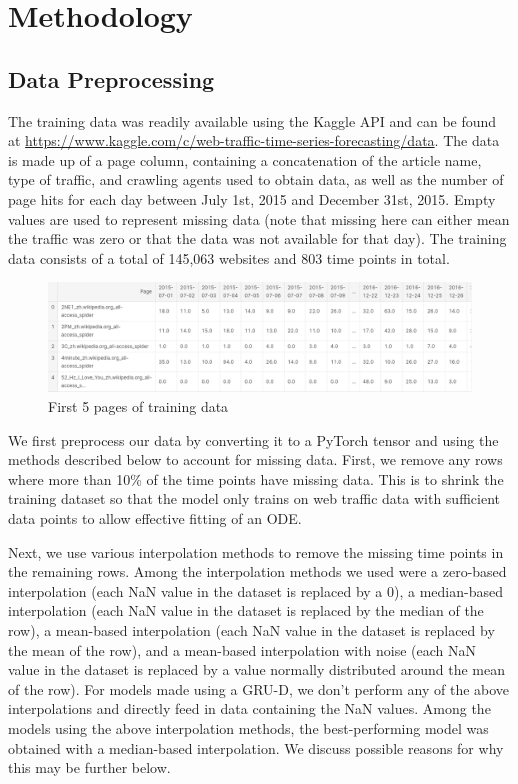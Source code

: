 \documentclass{article} %
\begin{document}
\section{Methodology}
\subsection{Data Preprocessing}

The training data was readily available using the Kaggle API and can be found at \url{https://www.kaggle.com/c/web-traffic-time-series-forecasting/data}. The data is made up of a page column, containing a concatenation of the article name, type of traffic, and crawling agents used to obtain data, as well as the number of page hits for each day between July 1st, 2015 and December 31st, 2015. Empty values are used to represent missing data (note that missing here can either mean the traffic was zero or that the data was not available for that day). The training data consists of a total of 145,063 websites and 803 time points in total.
\begin{figure}[h]
  \centering
  \includegraphics[width=13cm]{train_overview.png}
  \caption{First 5 pages of training data}
\end{figure}

We first preprocess our data by converting it to a PyTorch tensor and using the methods described below to account for missing data. First, we remove any rows where more than 10\% of the time points have missing data. This is to shrink the training dataset so that the model only trains on web traffic data with sufficient data points to allow effective fitting of an ODE.

Next, we use various interpolation methods to remove the missing time points in the remaining rows. Among the interpolation methods we used were a zero-based interpolation (each NaN value in the dataset is replaced by a 0), a median-based interpolation (each NaN value in the dataset is replaced by the median of the row), a mean-based interpolation (each NaN value in the dataset is replaced by the mean of the row), and a mean-based interpolation with noise (each NaN value in the dataset is replaced by a value normally distributed around the mean of the row). For models made using a GRU-D, we don't perform any of the above interpolations and directly feed in data containing the NaN values. Among the models using the above interpolation methods, the best-performing model was obtained with a median-based interpolation. We discuss possible reasons for why this may be further below.
\end{document}
